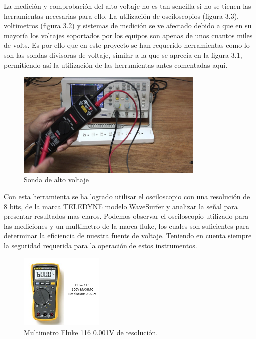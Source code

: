 La medición y comprobación del alto voltaje no es tan sencilla si no se tienen las herramientas necesarias para ello. La utilización de osciloscopios (figura 3.3), voltimetros (figura 3.2) y sistemas de medición se ve afectado debido a que en su mayoría los voltajes soportados por los equipos son apenas de unos cuantos miles de volts. Es por ello que en este proyecto se han requerido herramientas como lo son las sondas divisoras de voltaje, similar a la que se aprecia en la figura 3.1, permitiendo así la utilización de las herramientas antes comentadas aquí.\\

\begin{figure}[H]
\centering
\includegraphics[width=9cm]{Capitulo3/figs/sonda.png}
\caption{Sonda de alto voltaje}
\end{figure}

Con esta herramienta se ha logrado utilizar el osciloscopio con una resolución de 8 bits, de la marca TELEDYNE modelo WaveSurfer y analizar la señal para presentar resultados mas claros. Podemos observar el osciloscopio utilizado para las mediciones y un multimetro de la marca fluke, los cuales son suficientes para determinar la eficiencia de nuestra fuente de voltaje. Teniendo en cuenta siempre la seguridad requerida para la operación de estos instrumentos.


\begin{figure}[H]
\centering
\includegraphics[width=4cm]{Capitulo3/figs/multim.png}
\caption{Multimetro Fluke 116 0.001V de resolución.}
\end{figure}

